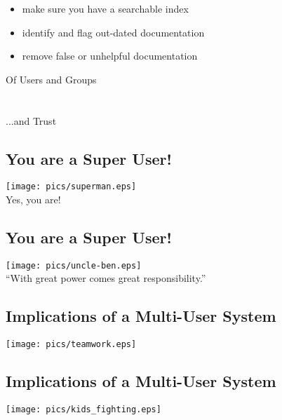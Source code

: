\documentclass[xga]{xdvislides}
\begin{document}
\begin{itemize}
	\item make sure you have a searchable index
	\item identify and flag out-dated documentation
	\item remove false or unhelpful documentation
\end{itemize}

\newpage
\vspace*{\fill}
\begin{center}
    \Hugesize
        Of Users and Groups\\ [1em]
    \hspace*{5mm}
    \blueline\\
    \hspace*{5mm}\\
	...and Trust
\end{center}
\vspace*{\fill}

\subsection{You are a Super User!}
\begin{center}
	\texttt{[image: pics/superman.eps]} \\
	\small
	Yes, you are!
	\Normalsize
\end{center}

\subsection{You are a Super User!}
\begin{center}
	\texttt{[image: pics/uncle-ben.eps]} \\
	\addvspace{.2in}
	\Huge
	``With great power comes great responsibility.''
	\Normalsize
\end{center}

\subsection{Implications of a Multi-User System}
\vspace*{\fill}
\begin{center}
	\texttt{[image: pics/teamwork.eps]}
\end{center}
\vspace*{\fill}

\subsection{Implications of a Multi-User System}
\vspace*{\fill}
\begin{center}
	\texttt{[image: pics/kids\_fighting.eps]}
\end{center}
\vspace*{\fill}
\end{document}

